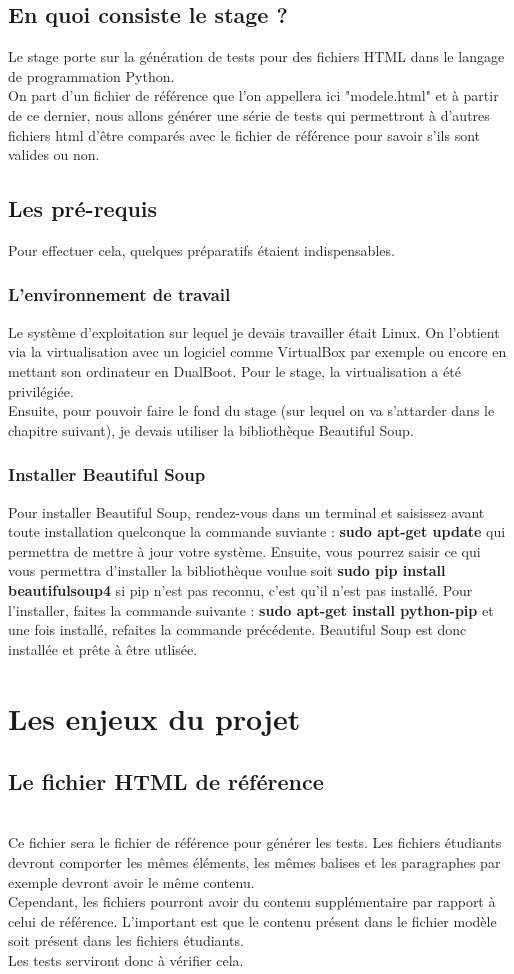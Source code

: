 \documentclass[12pt,twoside]{report}
\begin{document}
\section {En quoi consiste le stage ?}
Le stage porte sur la génération de tests pour des fichiers HTML dans le langage de programmation Python.\\On part d'un fichier de référence que l'on appellera ici "modele.html" et à partir de ce dernier, nous allons générer une série de tests qui permettront à d'autres fichiers html d'être comparés avec le fichier de référence pour savoir s'ils sont valides ou non.
\section {Les pré-requis}
Pour effectuer cela, quelques préparatifs étaient indispensables.
\subsection{L'environnement de travail}
Le système d'exploitation sur lequel je devais travailler était Linux. On l'obtient via la virtualisation avec un logiciel comme VirtualBox par exemple ou encore en mettant son ordinateur en DualBoot. Pour le stage, la virtualisation a été privilégiée.\\Ensuite, pour pouvoir faire le fond du stage (sur lequel on va s'attarder dans le chapitre suivant), je devais utiliser la bibliothèque Beautiful Soup.
\subsection{Installer Beautiful Soup}
Pour installer Beautiful Soup, rendez-vous dans un terminal et saisissez avant toute installation quelconque la commande suviante : \textbf{sudo apt-get update} qui permettra de mettre à jour votre système. Ensuite, vous pourrez saisir ce qui vous permettra d'installer la bibliothèque voulue soit \textbf{sudo pip install beautifulsoup4} si pip n'est pas reconnu, c'est qu'il n'est pas installé. Pour l'installer, faites la commande suivante : \textbf{sudo apt-get install python-pip} et une fois installé, refaites la commande précédente. Beautiful Soup est donc installée et prête à être utlisée.

\color{red}
\chapter{Les enjeux du projet}
\color{black}
\section{Le fichier HTML de référence}

\\Ce fichier sera le fichier de référence pour générer les tests. Les fichiers étudiants devront comporter les mêmes éléments, les mêmes balises et les paragraphes par exemple devront avoir le même contenu.\\ 
Cependant, les fichiers pourront avoir du contenu supplémentaire par rapport à celui de référence. L'important est que le contenu présent dans le fichier modèle soit présent dans les fichiers étudiants. \\
Les tests serviront donc à vérifier cela. 
\newpage
\end{document}
